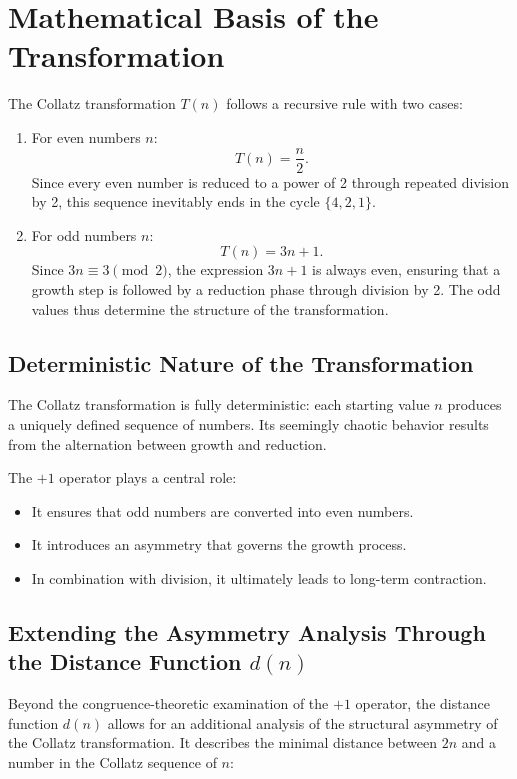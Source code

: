\documentclass[a4paper,12pt]{article}
\begin{document}
\section{Mathematical Basis of the Transformation}

The Collatz transformation \( T(n) \) follows a recursive rule with two cases:
\begin{enumerate}
    \item For even numbers \( n \):
    \[
    T(n) = \frac{n}{2}.
    \]
    Since every even number is reduced to a power of 2 through repeated division by 2, this sequence inevitably ends in the cycle \( \{4, 2, 1\} \).
    
    \item For odd numbers \( n \):
    \[
    T(n) = 3n + 1.
    \]
    Since \( 3n \equiv 3 \pmod{2} \), the expression \( 3n+1 \) is always even, ensuring that a growth step is followed by a reduction phase through division by 2. The odd values thus determine the structure of the transformation.
\end{enumerate}

\subsection{Deterministic Nature of the Transformation}

The Collatz transformation is fully deterministic: each starting value \( n \) produces a uniquely defined sequence of numbers. Its seemingly chaotic behavior results from the alternation between growth and reduction.

The \( +1 \) operator plays a central role:
\begin{itemize}
    \item It ensures that odd numbers are converted into even numbers.
    \item It introduces an asymmetry that governs the growth process.
    \item In combination with division, it ultimately leads to long-term contraction.
\end{itemize}

\subsection{Extending the Asymmetry Analysis Through the Distance Function \( d(n) \)}

Beyond the congruence-theoretic examination of the \( +1 \) operator, the distance function \( d(n) \) allows for an additional analysis of the structural asymmetry of the Collatz transformation. It describes the minimal distance between \( 2n \) and a number in the Collatz sequence of \( n \):
\end{document}
